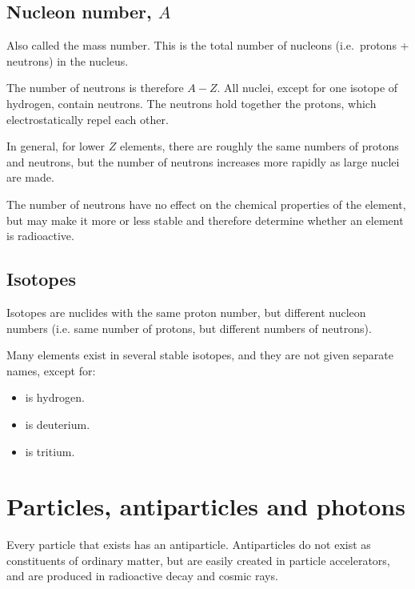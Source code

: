 \documentclass[a4paper,12pt]{article}
\begin{document}
\subsection{Nucleon number, $A$}

Also called the mass number.  This is the total number of nucleons (i.e.\ protons + neutrons) in the nucleus.

The number of neutrons is therefore $A-Z$.  All nuclei, except for one isotope of hydrogen, contain neutrons.  The neutrons hold together the protons, which electrostatically repel each other.

In general, for lower $Z$ elements, there are roughly the same numbers of protons and neutrons, but the number of neutrons increases more rapidly as large nuclei are made.

The number of neutrons have no effect on the chemical properties of the element, but may make it more or less stable and therefore determine whether an element is radioactive.

\subsection{Isotopes}

Isotopes are nuclides with the same proton number, but different nucleon numbers (i.e. same number of protons, but different numbers of neutrons).

Many elements exist in several stable isotopes, and they are not given separate names, except for:
\begin{itemize}
\item {} is hydrogen.
\item {} is deuterium.
\item {} is tritium.
\end{itemize}



\section{Particles, antiparticles and photons}

Every particle that exists has an antiparticle.  Antiparticles do not exist as constituents of ordinary matter, but are easily created in particle accelerators, and are produced in radioactive decay and cosmic rays.
\end{document}
